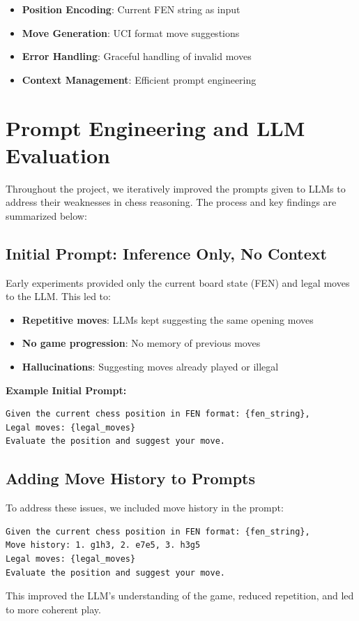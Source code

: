 \documentclass[11pt,a4paper]{report}
\begin{document}
\begin{itemize}
    \item \textbf{Position Encoding}: Current FEN string as input
    \item \textbf{Move Generation}: UCI format move suggestions
    \item \textbf{Error Handling}: Graceful handling of invalid moves
    \item \textbf{Context Management}: Efficient prompt engineering
\end{itemize}

\section{Prompt Engineering and LLM Evaluation}

Throughout the project, we iteratively improved the prompts given to LLMs to address their weaknesses in chess reasoning. The process and key findings are summarized below:

\subsection{Initial Prompt: Inference Only, No Context}
Early experiments provided only the current board state (FEN) and legal moves to the LLM. This led to:
\begin{itemize}
    \item \textbf{Repetitive moves}: LLMs kept suggesting the same opening moves
    \item \textbf{No game progression}: No memory of previous moves
    \item \textbf{Hallucinations}: Suggesting moves already played or illegal
\end{itemize}

\textbf{Example Initial Prompt:}
\begin{lstlisting}[style=Python]
Given the current chess position in FEN format: {fen_string},
Legal moves: {legal_moves}
Evaluate the position and suggest your move.
\end{lstlisting}

\subsection{Adding Move History to Prompts}
To address these issues, we included move history in the prompt:
\begin{lstlisting}[style=Python]
Given the current chess position in FEN format: {fen_string},
Move history: 1. g1h3, 2. e7e5, 3. h3g5
Legal moves: {legal_moves}
Evaluate the position and suggest your move.
\end{lstlisting}
This improved the LLM's understanding of the game, reduced repetition, and led to more coherent play.
\end{document}
